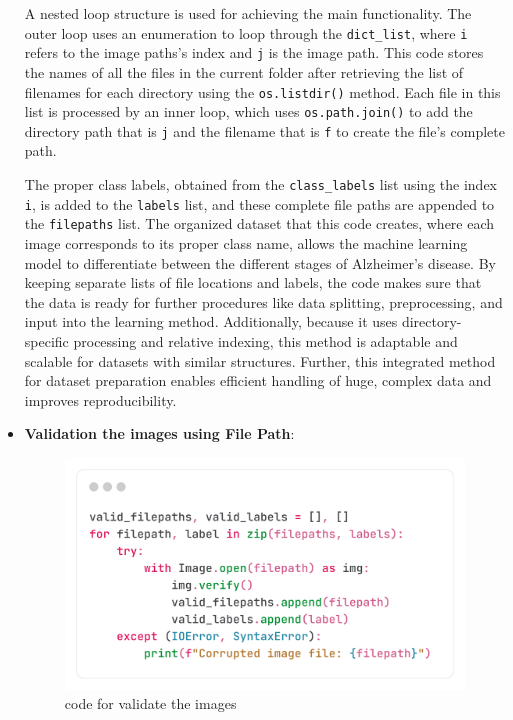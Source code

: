 \documentclass[12pt,onecolumn]{report}
\begin{document}
\begin{itemize}
    A nested loop structure is used for achieving the main functionality. The outer loop uses an enumeration to loop through the \texttt{dict\_list}, where \texttt{i} refers to the image paths's index and \texttt{j} is the image path. This code stores the names of all the files in the current folder after retrieving the list of filenames for each directory using the \texttt{os.listdir()} method. Each file in this list is processed by an inner loop, which uses \texttt{os.path.join()} to add the directory path that is \texttt{j} and the filename that is \texttt{f} to create the file's complete path.

    The proper class labels, obtained from the \texttt{class\_labels} list using the index \texttt{i}, is added to the \texttt{labels} list, and these complete file paths are appended to the \texttt{filepaths} list. The organized dataset that this code creates, where each image corresponds to its proper class name, allows the machine learning model to differentiate between the different stages of Alzheimer's disease. By keeping separate lists of file locations and labels, the code makes sure that the data is ready for further procedures like data splitting, preprocessing, and input into the learning method. Additionally, because it uses directory-specific processing and relative indexing, this method is adaptable and scalable for datasets with similar structures. Further, this integrated method for dataset preparation enables efficient handling of huge, complex data and improves reproducibility.
    \item \textbf{Validation the images using File Path}: 
    \begin{figure}[h!]
        \centering
        \includegraphics[width=0.6\columnwidth]{figures/validating_images.png}  %
        \caption{code for validate the images} %
        \label{fig:validating_the_image_using_image_paths} %
    \end{figure}

\end{itemize}
\end{document}
